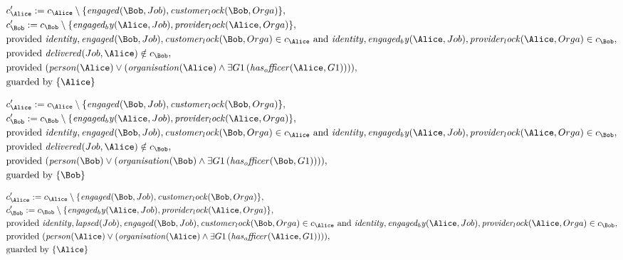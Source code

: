 \begin{align*}
&
c'_
{
\Alice
}
 := 
c_
{
\Alice
}
 \setminus 
\{
\mathit{
engaged
}
(
\Bob
,
Job
)
,
\mathit{
customer_lock
}
(
\Bob
,
Orga
)
\}
,\\
&
c'_
{
\Bob
}
 := 
c_
{
\Bob
}
 \setminus 
\{
\mathit{
engaged_by
}
(
\Alice
,
Job
)
,
\mathit{
provider_lock
}
(
\Alice
,
Orga
)
\}
,\\
&
\text{provided } 
\mathit{
identity
}
,
\mathit{
engaged
}
(
\Bob
,
Job
)
,
\mathit{
customer_lock
}
(
\Bob
,
Orga
)
 \in c_
{
\Alice
}
 \text{ and } 
\mathit{
identity
}
,
\mathit{
engaged_by
}
(
\Alice
,
Job
)
,
\mathit{
provider_lock
}
(
\Alice
,
Orga
)
 \in c_
{
\Bob
}
,\\
&
\text{provided } 
\mathit{
delivered
}
(
Job
,
\Alice
)
 \notin c_
{
\Bob
}
,\\
&
\text{provided } 
(
\mathit{
person
}
(
\Alice
)
\lor
(
\mathit{
organisation
}
(
\Alice
)
\land
\exists 
G1
\,(
\mathit{
has_officer
}
(
\Alice
,
G1
)
)
)
)
,\\
&
\text{guarded by } \{
\Alice
\}
\end{align*}

\begin{align*}
&
c'_
{
\Alice
}
 := 
c_
{
\Alice
}
 \setminus 
\{
\mathit{
engaged
}
(
\Bob
,
Job
)
,
\mathit{
customer_lock
}
(
\Bob
,
Orga
)
\}
,\\
&
c'_
{
\Bob
}
 := 
c_
{
\Bob
}
 \setminus 
\{
\mathit{
engaged_by
}
(
\Alice
,
Job
)
,
\mathit{
provider_lock
}
(
\Alice
,
Orga
)
\}
,\\
&
\text{provided } 
\mathit{
identity
}
,
\mathit{
engaged
}
(
\Bob
,
Job
)
,
\mathit{
customer_lock
}
(
\Bob
,
Orga
)
 \in c_
{
\Alice
}
 \text{ and } 
\mathit{
identity
}
,
\mathit{
engaged_by
}
(
\Alice
,
Job
)
,
\mathit{
provider_lock
}
(
\Alice
,
Orga
)
 \in c_
{
\Bob
}
,\\
&
\text{provided } 
\mathit{
delivered
}
(
Job
,
\Alice
)
 \notin c_
{
\Bob
}
,\\
&
\text{provided } 
(
\mathit{
person
}
(
\Bob
)
\lor
(
\mathit{
organisation
}
(
\Bob
)
\land
\exists 
G1
\,(
\mathit{
has_officer
}
(
\Bob
,
G1
)
)
)
)
,\\
&
\text{guarded by } \{
\Bob
\}
\end{align*}

\begin{align*}
&
c'_
{
\Alice
}
 := 
c_
{
\Alice
}
 \setminus 
\{
\mathit{
engaged
}
(
\Bob
,
Job
)
,
\mathit{
customer_lock
}
(
\Bob
,
Orga
)
\}
,\\
&
c'_
{
\Bob
}
 := 
c_
{
\Bob
}
 \setminus 
\{
\mathit{
engaged_by
}
(
\Alice
,
Job
)
,
\mathit{
provider_lock
}
(
\Alice
,
Orga
)
\}
,\\
&
\text{provided } 
\mathit{
identity
}
,
\mathit{
lapsed
}
(
Job
)
,
\mathit{
engaged
}
(
\Bob
,
Job
)
,
\mathit{
customer_lock
}
(
\Bob
,
Orga
)
 \in c_
{
\Alice
}
 \text{ and } 
\mathit{
identity
}
,
\mathit{
engaged_by
}
(
\Alice
,
Job
)
,
\mathit{
provider_lock
}
(
\Alice
,
Orga
)
 \in c_
{
\Bob
}
,\\
&
\text{provided } 
(
\mathit{
person
}
(
\Alice
)
\lor
(
\mathit{
organisation
}
(
\Alice
)
\land
\exists 
G1
\,(
\mathit{
has_officer
}
(
\Alice
,
G1
)
)
)
)
,\\
&
\text{guarded by } \{
\Alice
\}
\end{align*}
